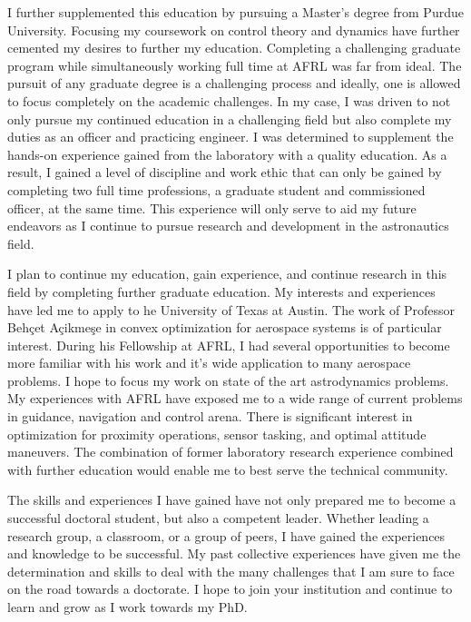 \documentclass[12pt, oneside]{article}   	%
\begin{document}
I further supplemented this education by pursuing a Master's degree from Purdue University.
Focusing my coursework on control theory and dynamics have further cemented my desires to further my education.
Completing a challenging graduate program while simultaneously working full time at AFRL was far from ideal.
The pursuit of any graduate degree is a challenging process and ideally, one is allowed to focus completely on the academic challenges.
In my case, I was driven to not only pursue my continued education in a challenging field but also complete my duties as an officer and practicing engineer. 
I was determined to supplement the hands-on experience gained from the laboratory with a quality education.
As a result, I gained a level of discipline and work ethic that can only be gained by completing two full time professions, a graduate student and commissioned officer, at the same time.
This experience will only serve to aid my future endeavors as I continue to pursue research and development in the astronautics field.



I plan to continue my education, gain experience, and continue research in this field by completing further graduate education.   
My interests and experiences have led me to apply to he University of Texas at Austin. 
The work of Professor Beh\c{c}et A\c{c}ikme\c{s}e in convex optimization for aerospace systems is of particular interest.
During his Fellowship at AFRL, I had several opportunities to become more familiar with his work and it's wide application to many aerospace problems. 
I hope to focus my work on state of the art astrodynamics problems. 
My experiences with AFRL have exposed me to a wide range of current problems in guidance, navigation and control arena. 
There is significant interest in optimization for proximity operations, sensor tasking, and optimal attitude maneuvers.  
The combination of former laboratory research experience combined with further education would enable me to best serve the technical community.


The skills and experiences I have gained have not only prepared me to become a successful doctoral student, but also a competent leader.
Whether leading a research group, a classroom, or a group of peers, I have gained the experiences and knowledge to be successful. 
My past collective experiences have given me the determination and skills to deal with the many challenges that I am sure to face on the road towards a doctorate. 
I hope to join your institution and continue to learn and grow as I work towards my PhD.


\end{document}
